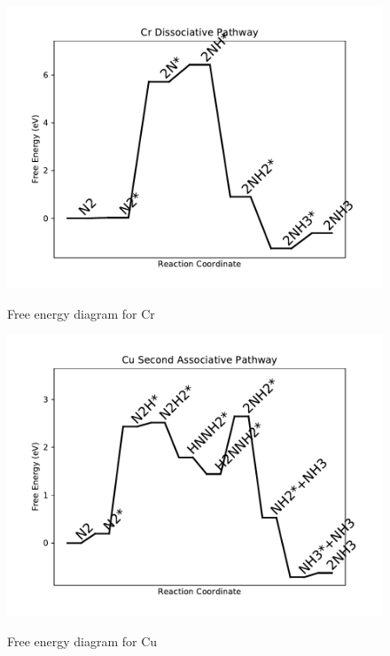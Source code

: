\documentclass{article}
\begin{document}
\newpage
\begin{figure}
\includegraphics[width=1\linewidth]{data/plots/Cr_dissociative.pdf}
\label{fig:Cr_dissociative}
\caption{Free energy diagram for Cr}
\end{figure}

\begin{figure}
\includegraphics[width=1\linewidth]{data/plots/Cu_associative_2.pdf}
\label{fig:Cu_associative_2}
\caption{Free energy diagram for Cu}
\end{figure}
\end{document}
